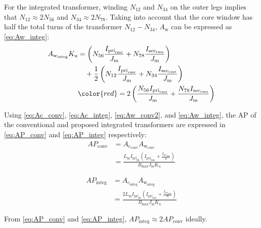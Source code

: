 \documentclass[lettersize,journal]{IEEEtran}
\begin{document}
For the integrated transformer, {\color{red} winding $N_{12}$ and $N_{34}$ on the outer legs implies that $N_{12} \approx 2N_{56}$ and $N_{34} \approx 2N_{78}$.} Taking into account that the core window has half the total turns of the transformer $N_{12}-N_{34}$, $A_{\mathrm{w}}$ can be expressed as \eqref{eq:Aw_integ}:
\begin{align}
\label{eq:Aw_integ}
A_{\mathrm{w}_{\mathrm{integ}}} K_{\mathrm{u}} &= \left(N_{56} \frac{I_{\mathrm{pri}_{\mathrm{rms}}}}{J_{\mathrm{m}}} + N_{78} \frac{I_{\mathrm{sec}_{\mathrm{rms}}}}{J_{\mathrm{m}}}\right) \nonumber \\
&\quad + \frac{1}{2}\left(N_{12} \frac{I_{\mathrm{pri}_{\mathrm{rms}}}}{J_{\mathrm{m}}} + N_{34} \frac{I_{\mathrm{sec}_{\mathrm{rms}}}}{J_{\mathrm{m}}}\right) \nonumber \\
&{\color{red} = 2 \left( \frac{N_{56} I_{\mathrm{pri}_{\mathrm{rms}}}}{J_{\mathrm{m}}} + \frac{N_{78} I_{\mathrm{sec}_{\mathrm{rms}}}}{J_{\mathrm{m}}} \right) }
\end{align}

{\color{red} Using \eqref{eq:Ac_conv}, \eqref{eq:Ac_integ}, \eqref{eq:Aw_conv2}, and \eqref{eq:Aw_integ}, the AP of the conventional and proposed integrated transformers are expressed in \eqref{eq:AP_conv} and \eqref{eq:AP_integ} respectively:
\begin{align}
\label{eq:AP_conv}
AP_{\mathrm{conv}} &= A_{\mathrm{c}_{\mathrm{conv}}} A_{\mathrm{w}_{\mathrm{conv}}} \nonumber \\ &=\frac{L_{\mathrm{m}} I_{\mathrm{pri}_{\mathrm{pk}}} \left( I_{\mathrm{pri}_{\mathrm{rms}}} + \frac{I_{\mathrm{sec}_{\mathrm{rms}}}}{n} \right)}{B_{\mathrm{max}} J_{\mathrm{m}} K_{\mathrm{u}}}
\end{align}

\begin{align}
\label{eq:AP_integ}
AP_{\mathrm{integ}} &= A_{\mathrm{c}_{\mathrm{integ}}} A_{\mathrm{w}_{\mathrm{integ}}} \nonumber \\ &= \frac{2 L_{\mathrm{m}} I_{\mathrm{pri}_{\mathrm{pk}}} \left( I_{\mathrm{pri}_{\mathrm{rms}}} + \frac{I_{\mathrm{sec}_{\mathrm{rms}}}}{n} \right)}{B_{\mathrm{max}} J_{\mathrm{m}} K_{\mathrm{u}}}
\end{align}

From \eqref{eq:AP_conv} and \eqref{eq:AP_integ}, $AP_{\mathrm{integ}} \approx 2 AP_{\mathrm{conv}}$ ideally.}
\end{document}
